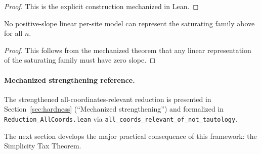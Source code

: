 \begin{proof}
This is the explicit construction mechanized in Lean.
\end{proof}

\begin{corollary}\label{cor:linear-positive-no-saturation}
No positive-slope linear per-site model can represent the saturating family above for all $n$.
\end{corollary}

\begin{proof}
This follows from the mechanized theorem that any linear representation of the saturating family must have zero slope.
\end{proof}

\paragraph{Mechanized strengthening reference.}
The strengthened all-coordinates-relevant reduction is presented in Section~\ref{sec:hardness} (``Mechanized strengthening'') and formalized in \texttt{Reduction\_AllCoords.lean} via \texttt{all\_coords\_relevant\_of\_not\_tautology}.

The next section develops the major practical consequence of this framework: the Simplicity Tax Theorem.
